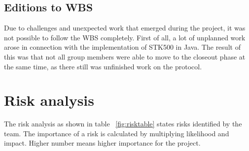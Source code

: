 \subsection{Editions to WBS}
Due to challenges and unexpected work that emerged during the project, it was not possible to follow the WBS completely. First of all, a lot of unplanned work arose in connection with the implementation of STK500 in Java. The result of this was that not all group members were able to move to the closeout phase at the same time, as there still was unfinished work on the protocol.

\section{Risk analysis}
The risk analysis as shown in table ~\ref{fig:risktable} states risks identified by the team. The importance of a risk is calculated by multiplying likelihood and impact. Higher number means higher importance for the project. 

